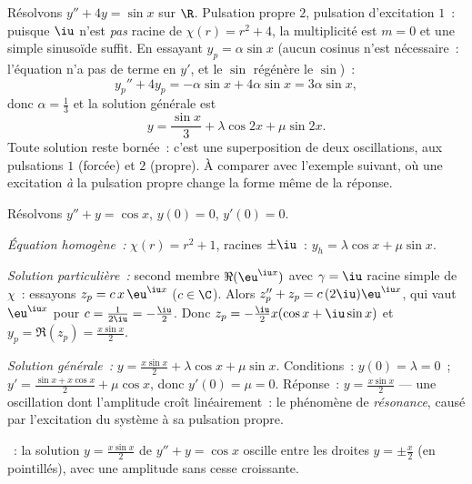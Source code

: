 \begin{example}\label{ex:b1:diffeq:offresonance}
Résolvons $y'' + 4y = \sin x$ sur $\R$. Pulsation propre $2$,
pulsation d'excitation $1$~: puisque $\iu$ n'est \emph{pas} racine de
$\chi(r) = r^2 + 4$, la multiplicité est $m = 0$ et une simple
sinusoïde suffit. En essayant $y_p = \alpha\sin x$ (aucun cosinus
n'est nécessaire~: l'équation n'a pas de terme en $y'$, et le $\sin$
régénère le $\sin$)~:
\[
y_p'' + 4y_p = -\alpha\sin x + 4\alpha\sin x = 3\alpha\sin x ,
\]
donc $\alpha = \frac13$ et la solution générale est
\[
y = \frac{\sin x}3 + \lambda\cos 2x + \mu\sin 2x .
\]
Toute solution reste bornée~: c'est une superposition de deux
oscillations, aux pulsations $1$ (forcée) et $2$ (propre). À comparer
avec l'exemple suivant, où une excitation \emph{à} la pulsation propre
change la forme même de la réponse.
\end{example}

\begin{example}\label{ex:b1:diffeq:oscillation}
Résolvons $y'' + y = \cos x$, $y(0) = 0$, $y'(0) = 0$.

\emph{Équation homogène~:} $\chi(r) = r^2 + 1$, racines $\pm\iu$~:
$y_h = \lambda\cos x + \mu \sin x$.

\emph{Solution particulière~:} second membre $\Re(\eu^{\iu x})$ avec
$\gamma = \iu$ racine simple de $\chi$~: essayons $z_p = c\, x\,
\eu^{\iu x}$ ($c \in \C$). Alors $z_p'' + z_p = c\,(2\iu)\eu^{\iu x}$,
qui vaut $\eu^{\iu x}$ pour $c = \frac{1}{2\iu} = -\frac\iu2$. Donc
$z_p = -\frac{\iu}{2} x (\cos x + \iu \sin x)$ et $y_p = \Re(z_p) =
\frac{x \sin x}{2}$.

\emph{Solution générale~:} $y = \frac{x\sin x}{2} + \lambda\cos x +
\mu\sin x$. Conditions~: $y(0) = \lambda = 0$~; $y' = \frac{\sin x +
x\cos x}{2} + \mu\cos x$, donc $y'(0) = \mu = 0$. Réponse~: $y =
\frac{x\sin x}{2}$ --- une oscillation dont l'amplitude croît
linéairement~: le phénomène de \emph{résonance},
causé par l'excitation du système à sa pulsation propre.
\end{example}

\begin{omfigure}

{\small {}~: la solution $y = \frac{x \sin x}{2}$ de $y'' + y =
\cos x$ oscille entre les droites $y = \pm\frac x2$ (en pointillés),
avec une amplitude sans cesse croissante.}
\end{omfigure}

